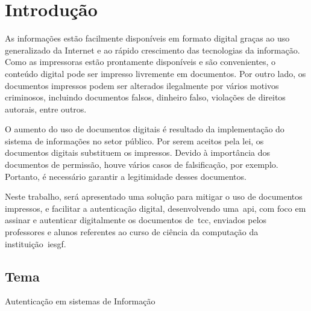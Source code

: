\chapter{Introdução}\label{ch:introducao}

As informações estão facilmente disponíveis em formato digital graças ao uso
generalizado da Internet e ao rápido crescimento das tecnologias da informação.
Como as impressoras estão prontamente disponíveis e são convenientes, o conteúdo
digital pode ser impresso livremente em documentos.
Por outro lado, os documentos impressos podem ser alterados ilegalmente por
vários motivos criminosos, incluindo documentos falsos, dinheiro falso,
violações de direitos autorais, entre outros\cite{tsai2019}.

O aumento do uso de documentos digitais é resultado da implementação do
sistema de informações no setor público.
Por serem aceitos pela lei, os documentos digitais substituem os impressos.
Devido à importância dos documentos de permissão, houve vários casos de
falsificação, por exemplo.
Portanto, é necessário garantir a legitimidade desses documentos\cite{arief2019}.

Neste trabalho, será apresentado uma solução para mitigar o uso de documentos
impressos, e facilitar a autenticação digital, desenvolvendo uma~\acrfull{api},
com foco em assinar e autenticar digitalmente os documentos de~\acrfull{tcc},
enviados pelos professores e alunos referentes ao curso de ciência da computação
da instituição~\acrlong{iesgf}.
\section{Tema}\label{sec:tema}
Autenticação em sistemas de Informação



